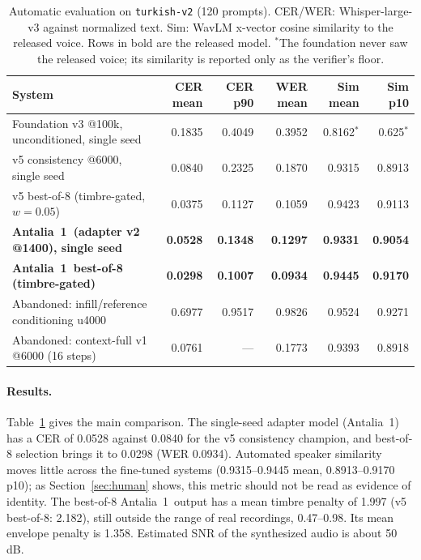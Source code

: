 \documentclass[10pt,twocolumn]{article}
\newcommand{\antalia}{Antalia~1}
\newcommand{\code}[1]{\texttt{#1}}
\begin{document}
\begin{table}[t]
\centering
\small
\caption{Automatic evaluation on \code{turkish-v2} (120 prompts). CER/WER: Whisper-large-v3 against normalized text. Sim: WavLM x-vector cosine similarity to the released voice. Rows in bold are the released model. $^*$The foundation never saw the released voice; its similarity is reported only as the verifier's floor.}
\label{tab:auto}
\begin{tabular}{@{}lrrrrr@{}}
\toprule
System & CER mean & CER p90 & WER mean & Sim mean & Sim p10 \\
\midrule
Foundation v3 @100k, unconditioned, single seed & 0.1835 & 0.4049 & 0.3952 & 0.8162$^*$ & 0.625$^*$ \\
v5 consistency @6000, single seed & 0.0840 & 0.2325 & 0.1870 & 0.9315 & 0.8913 \\
v5 best-of-8 (timbre-gated, $w=0.05$) & 0.0375 & 0.1127 & 0.1059 & 0.9423 & 0.9113 \\
\textbf{\antalia\ (adapter v2 @1400), single seed} & \textbf{0.0528} & \textbf{0.1348} & \textbf{0.1297} & \textbf{0.9331} & \textbf{0.9054} \\
\textbf{\antalia\ best-of-8 (timbre-gated)} & \textbf{0.0298} & \textbf{0.1007} & \textbf{0.0934} & \textbf{0.9445} & \textbf{0.9170} \\
\midrule
Abandoned: infill/reference conditioning u4000 & 0.6977 & 0.9517 & 0.9826 & 0.9524 & 0.9271 \\
Abandoned: context-full v1 @6000 (16 steps) & 0.0761 & --- & 0.1773 & 0.9393 & 0.8918 \\
\bottomrule
\end{tabular}
\end{table}

\paragraph{Results.} Table~\ref{tab:auto} gives the main comparison. The single-seed adapter model (\antalia) has a CER of 0.0528 against 0.0840 for the v5 consistency champion, and best-of-8 selection brings it to 0.0298 (WER 0.0934). Automated speaker similarity moves little across the fine-tuned systems (0.9315--0.9445 mean, 0.8913--0.9170 p10); as Section~\ref{sec:human} shows, this metric should not be read as evidence of identity. The best-of-8 \antalia\ output has a mean timbre penalty of 1.997 (v5 best-of-8: 2.182), still outside the range of real recordings, 0.47--0.98. Its mean envelope penalty is 1.358. Estimated SNR of the synthesized audio is about 50\,dB.
\end{document}

